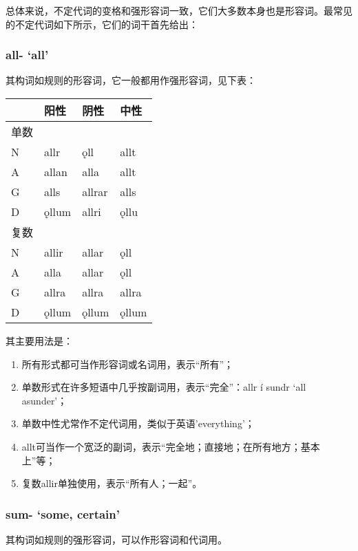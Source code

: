 \begin{introduction}[章节要点]
总体来说，不定代词的变格和强形容词一致，它们大多数本身也是形容词。最常见的不定代词如下所示，它们的词干首先给出：

\subsubsection{all- `all‌'}
其构词如规则的形容词，它一般都用作强形容词，见下表：

\begin{longtable}{llll}
    \toprule
         & 阳性  & 阴性   & 中性  \\
    \midrule
    \endhead
    \bottomrule
    \endfoot
    单数 &       &        &       \\
    N    & allr  & ǫll    & allt  \\
    A    & allan & alla   & allt  \\
    G    & alls  & allrar & alls  \\
    D    & ǫllum & allri  & ǫllu  \\
    复数 &       &        &       \\
    N    & allir & allar  & ǫll   \\
    A    & alla  & allar  & ǫll   \\
    G    & allra & allra  & allra \\
    D    & ǫllum & ǫllum  & ǫllum \\
\end{longtable}

其主要用法是：

\begin{enumerate}
    \item
          所有形式都可当作形容词或名词用，表示``所有''；
    \item
          单数形式在许多短语中几乎按副词用，表示``完全''：allr í sundr `all
          asunder'；
    \item
          单数中性尤常作不定代词用，类似于英语'everything'；
    \item
          allt可当作一个宽泛的副词，表示``完全地；直接地；在所有地方；基本上''等；
    \item
          复数allir单独使用，表示``所有人；一起''。
\end{enumerate}

\subsubsection{sum- `some, certain‌'}

其构词如规则的强形容词，可以作形容词和代词用。


\end{introduction}

